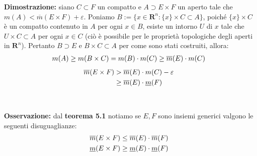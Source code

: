 \documentclass{article}
\begin{document}
\textbf{Dimostrazione:} siano $C \subset F$ un compatto e $A \supset E \times F$ un aperto tale che $m(A) < \overline{m}(E \times F) + \varepsilon$. Poniamo $B := \{ x \in \mathbf{R}^n : \{ x \} \times C \subset A \}$, poiché $\{ x \} \times C$ è un compatto contenuto in $A$ per ogni $x \in B$, esiste un intorno $U$ di $x$ tale che $U \times C \subset A$ per ogni $x \in C$ (ciò è possibile per le proprietà topologiche degli aperti in $\mathbf{R}^n$). Pertanto $B \supset E$ e $B \times C \subset A$ per come sono stati costruiti, allora:
\begin{gather}
    m(A) \geq m(B \times C) = m(B) \cdot m(C) \geq \overline{m}(E) \cdot m(C) \notag
\end{gather}
\begin{align}
    \overline{m}(E \times F) &> \overline{m}(E) \cdot m(C) - \varepsilon \notag \\
    &\geq \overline{m}(E) \cdot \underline{m}(F) \notag
\end{align}
\\ \\
\textbf{Osservazione:} dal \textbf{teorema 5.1} notiamo se $E, F$ sono insiemi generici valgono le seguenti disuguaglianze:
\begin{gather}
    \overline{m}(E \times F) \leq \overline{m}(E) \cdot \overline{m}(F) \notag \\
    \underline{m}(E \times F) \geq \underline{m}(E) \cdot \underline{m}(F) \notag
\end{gather} \newpage
\end{document}
